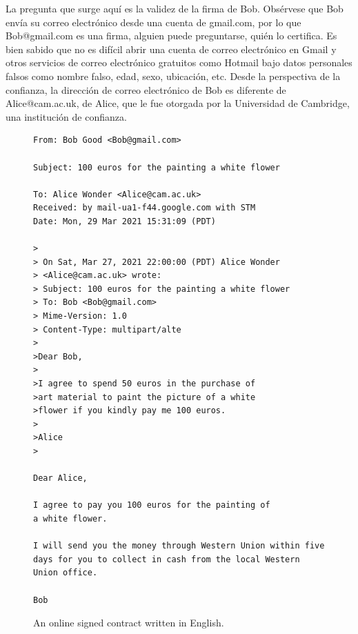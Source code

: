 \documentclass[12pt]{report} %
\begin{document}
La pregunta que surge aquí es la validez de la firma de Bob. Obsérvese que Bob envía su correo electrónico desde una cuenta de gmail.com, por lo que Bob@gmail.com es una firma, alguien puede preguntarse, quién lo certifica. Es bien sabido que no es difícil abrir una cuenta de correo electrónico en Gmail y otros servicios de correo electrónico gratuitos como Hotmail bajo datos personales falsos como nombre falso, edad, sexo, ubicación, etc. Desde la perspectiva de la confianza, la dirección de correo electrónico de Bob es diferente de Alice@cam.ac.uk, de Alice, que le fue otorgada por la Universidad de Cambridge, una institución de confianza.

\begin{figure}
\begin{tcolorbox}[width=\textwidth,
   title={This is a contract between Alice and Bob.},
   colframe=black!75!white,
   colbacktitle=green!50!white, coltitle=black,
   colupper=black,    colback=green!5!white]

\begin{verbatim}
From: Bob Good <Bob@gmail.com> 

Subject: 100 euros for the painting a white flower

To: Alice Wonder <Alice@cam.ac.uk>
Received: by mail-ua1-f44.google.com with STM
Date: Mon, 29 Mar 2021 15:31:09 (PDT)

>
> On Sat, Mar 27, 2021 22:00:00 (PDT) Alice Wonder
> <Alice@cam.ac.uk> wrote:
> Subject: 100 euros for the painting a white flower
> To: Bob <Bob@gmail.com>
> Mime-Version: 1.0
> Content-Type: multipart/alte
>
>Dear Bob,
>
>I agree to spend 50 euros in the purchase of 
>art material to paint the picture of a white
>flower if you kindly pay me 100 euros.
>
>Alice
>

Dear Alice,

I agree to pay you 100 euros for the painting of 
a white flower.

I will send you the money through Western Union within five 
days for you to collect in cash from the local Western 
Union office.

Bob
\end{verbatim}
\end{tcolorbox}
\caption{An online signed contract written in  English.}
\label{box:contengsignonline}
\end{figure}
\end{document}
